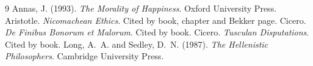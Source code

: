 \documentclass{situationist-preprint}
\begin{document}
\begin{thebibliography}{9}\small
{} Annas, J. (1993). \emph{The Morality of Happiness}. Oxford University Press.
 Aristotle. \emph{Nicomachean Ethics}. Cited by book, chapter and Bekker page.
 Cicero. \emph{De Finibus Bonorum et Malorum}. Cited by book.
 Cicero. \emph{Tusculan Disputations}. Cited by book.
 Long, A.~A. and Sedley, D.~N. (1987). \emph{The Hellenistic Philosophers}. Cambridge University Press.
\end{thebibliography}
\end{document}
